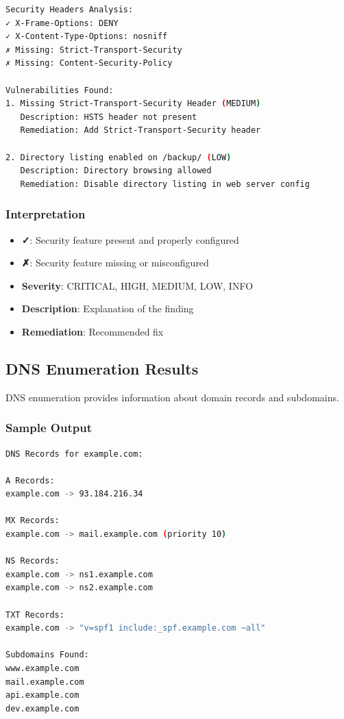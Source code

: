 \documentclass[12pt,a4paper]{report}
\begin{document}
\begin{lstlisting}[language=bash]
Security Headers Analysis:
✓ X-Frame-Options: DENY
✓ X-Content-Type-Options: nosniff
✗ Missing: Strict-Transport-Security
✗ Missing: Content-Security-Policy

Vulnerabilities Found:
1. Missing Strict-Transport-Security Header (MEDIUM)
   Description: HSTS header not present
   Remediation: Add Strict-Transport-Security header

2. Directory listing enabled on /backup/ (LOW)
   Description: Directory browsing allowed
   Remediation: Disable directory listing in web server config
\end{lstlisting}

\subsubsection{Interpretation}

\begin{itemize}
    \item \textbf{✓}: Security feature present and properly configured
    \item \textbf{✗}: Security feature missing or misconfigured
    \item \textbf{Severity}: CRITICAL, HIGH, MEDIUM, LOW, INFO
    \item \textbf{Description}: Explanation of the finding
    \item \textbf{Remediation}: Recommended fix
\end{itemize}

\subsection{DNS Enumeration Results}

DNS enumeration provides information about domain records and subdomains.

\subsubsection{Sample Output}

\begin{lstlisting}[language=bash]
DNS Records for example.com:

A Records:
example.com -> 93.184.216.34

MX Records:
example.com -> mail.example.com (priority 10)

NS Records:
example.com -> ns1.example.com
example.com -> ns2.example.com

TXT Records:
example.com -> "v=spf1 include:_spf.example.com ~all"

Subdomains Found:
www.example.com
mail.example.com
api.example.com
dev.example.com
\end{lstlisting}
\end{document}

